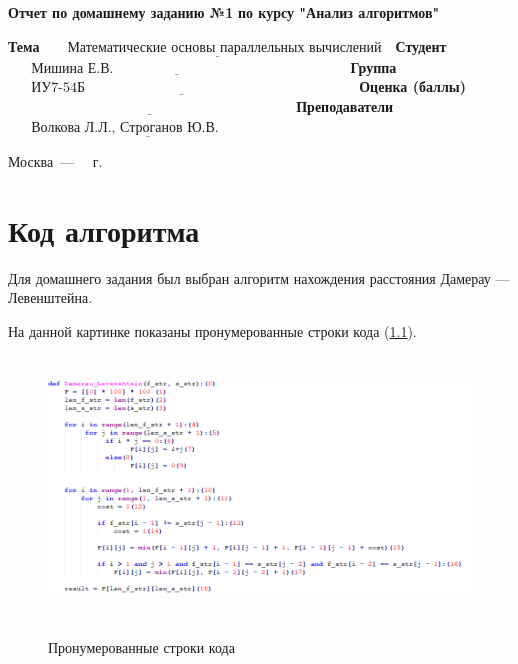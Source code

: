 \documentclass[12pt]{report}
\begin{document}
\begin{titlepage}
		
		\begin{center}
			\Large\textbf{Отчет по домашнему заданию №1}\newline
			\Large\textbf{по курсу "Анализ алгоритмов"}\newline
		\end{center}
	
		\noindent\textbf{Тема} $\underline{\text{~~~~~Математические основы параллельных вычислений~~}}$\newline\newline\newline
		\noindent\textbf{Студент} $\underline{\text{~~~~~Мишина Е.В.~~~~~~~~~~~~~~~~~~~~~~~~~~~~~~~~~~~~~~~~~~~~~~~~~~}}$\newline\newline
		\noindent\textbf{Группа} $\underline{\text{~~~~~ИУ7-54Б~~~~~~~~~~~~~~~~~~~~~~~~~~~~~~~~~~~~~~~~~~~~~~~~~~~~~~~~~~}}$\newline\newline
		\noindent\textbf{Оценка (баллы)} $\underline{\text{~~~~~~~~~~~~~~~~~~~~~~~~~~~~~~~~~~~~~~~~~~~~~~~~~~~~~~~~~~~~~}}$\newline\newline
		\noindent\textbf{Преподаватели} $\underline{\text{~~~~~Волкова Л.Л., Строганов Ю.В.~~~~~~~~~~~~~~~}}$\newline
		
		\begin{center}
			\vfill
			Москва~---~\the\year
			~г.
		\end{center}
	\restoregeometry
	\end{titlepage}
	
	\tableofcontents
	
	\newpage
	
	\chapter{Код алгоритма}
		Для домашнего задания был выбран алгоритм нахождения  расстояния Дамерау — Левенштейна.
	
	
	На данной картинке показаны пронумерованные строки кода (\ref{ris:imageCODE}).

	\begin{figure}[H]	
		{\includegraphics[height = 7cm]{CODE.png}}
		\caption{Пронумерованные строки кода}
		\label{ris:imageCODE}
	\end{figure}
\end{document}
